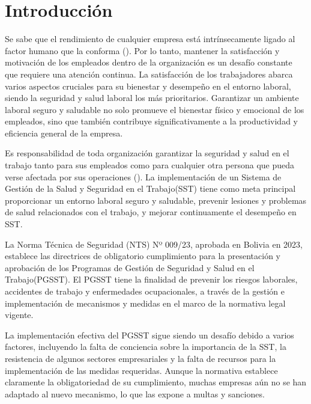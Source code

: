 \chapter{Introducción}
\label{sec:introduction}

Se sabe que el rendimiento de cualquier empresa está intrínsecamente ligado al factor humano que la conforma (\cite{krekel2019employee}). Por lo tanto, mantener la satisfacción y motivación de los empleados dentro de la organización es un desafío constante que requiere una atención continua. La satisfacción de los trabajadores abarca varios aspectos cruciales para su bienestar y desempeño en el entorno laboral, siendo la seguridad y salud laboral los más prioritarios. Garantizar un ambiente laboral seguro y saludable no solo promueve el bienestar físico y emocional de los empleados, sino que también contribuye significativamente a la productividad y eficiencia general de la empresa. \par
Es responsabilidad de toda organización garantizar la seguridad y salud en el trabajo tanto para sus empleados como para cualquier otra persona que pueda verse afectada por sus operaciones (\cite{Bolivia1979}). La implementación de un Sistema de Gestión de la Salud y Seguridad en el Trabajo(SST) tiene como meta principal proporcionar un entorno laboral seguro y saludable, prevenir lesiones y problemas de salud relacionados con el trabajo, y mejorar continuamente el desempeño en SST.\par
La Norma Técnica de Seguridad (NTS) Nº 009/23, aprobada en Bolivia en 2023, establece las directrices de obligatorio cumplimiento para la presentación y aprobación de los Programas de Gestión de Seguridad y Salud en el Trabajo(PGSST). El PGSST tiene la finalidad de prevenir los riesgos laborales, accidentes de trabajo y enfermedades ocupacionales, a través de la gestión e implementación de mecanismos y medidas en el marco de la normativa legal vigente.\par
La implementación efectiva del PGSST sigue siendo un desafío debido a varios factores, incluyendo la falta de conciencia sobre la importancia de la SST, la resistencia de algunos sectores empresariales y la falta de recursos para la implementación de las medidas requeridas. Aunque la normativa establece claramente la obligatoriedad de su cumplimiento, muchas empresas aún no se han adaptado al nuevo mecanismo, lo que las expone a multas y sanciones.\par

